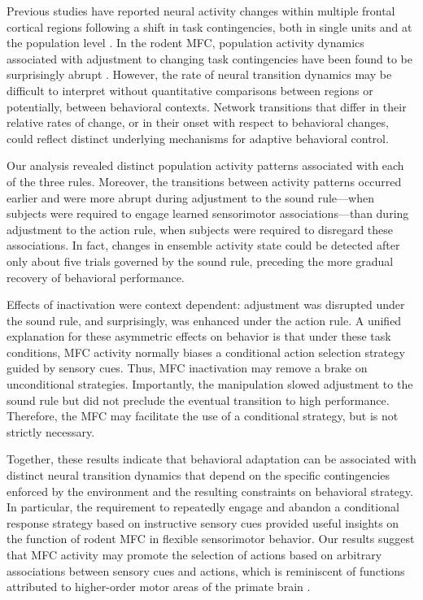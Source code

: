 Previous studies have reported neural activity changes within multiple frontal cortical regions following a shift in task contingencies, both in single units \citep{asaad2000task,rich2009rat,rodgers2014neural} and at the population level \citep{pasupathy2005different,rich2009rat,antzoulatos2011differences,mante2013context,stokes2013dynamic}. In the rodent MFC, population activity dynamics associated with adjustment to changing task contingencies have been found to be surprisingly abrupt \citep{durstewitz2010abrupt,karlsson2012network}. However, the rate of neural transition dynamics may be difficult to interpret without quantitative comparisons between regions \citep{pasupathy2005different,antzoulatos2011differences} or potentially, between behavioral contexts. Network transitions that differ in their relative rates of change, or in their onset with respect to behavioral changes, could reflect distinct underlying mechanisms for adaptive behavioral control.

Our analysis revealed distinct population activity patterns associated with each of the three rules. Moreover, the transitions between activity patterns occurred earlier and were more abrupt during adjustment to the sound rule---when subjects were required to engage learned sensorimotor associations---than during adjustment to the action rule, when subjects were required to disregard these associations. In fact, changes in ensemble activity state could be detected after only about five trials governed by the sound rule, preceding the more gradual recovery of behavioral performance.  

Effects of inactivation were context dependent: adjustment was disrupted under the sound rule, and surprisingly, was enhanced under the action rule. A unified explanation for these asymmetric effects on behavior is that under these task conditions, MFC activity normally biases a conditional action selection strategy guided by sensory cues. Thus, MFC inactivation may remove a brake on unconditional strategies. Importantly, the manipulation slowed adjustment to the sound rule but did not preclude the eventual transition to high performance. Therefore, the MFC may facilitate the use of a conditional strategy, but is not strictly necessary. 

Together, these results indicate that behavioral adaptation can be associated with distinct neural transition dynamics that depend on the specific contingencies enforced by the environment and the resulting constraints on behavioral strategy. In particular, the requirement to repeatedly engage and abandon a conditional response strategy based on instructive sensory cues provided useful insights on the function of rodent MFC in flexible sensorimotor behavior. Our results suggest that MFC activity may promote the selection of actions based on arbitrary associations between sensory cues and actions, which is reminiscent of functions attributed to higher-order motor areas of the primate brain \citep{mitz1991learning,chen1995neuronal,wise2000arbitrary}.

